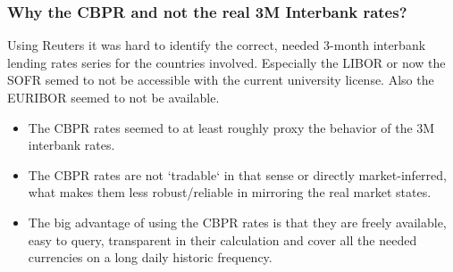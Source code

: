 \begin{frame}
    \frametitle{Why the CBPR and not the real 3M Interbank rates?}
    \scriptsize{
    Using Reuters it was hard to identify the correct, needed 3-month interbank lending rates series for the countries involved. Especially the LIBOR or now the SOFR semed to not be accessible with the current university license. Also the EURIBOR seemed to not be available.
    \begin{itemize}
        \item The CBPR rates seemed to at least roughly proxy the behavior of the 3M interbank rates.
        \item The CBPR rates are not `tradable` in that sense or directly market-inferred, what makes them less robust/reliable in mirroring the real market states.
        \item The big advantage of using the CBPR rates is that they are freely available, easy to query, transparent in their calculation and cover all the needed currencies on a long daily historic frequency.
    \end{itemize}
    }
\end{frame}